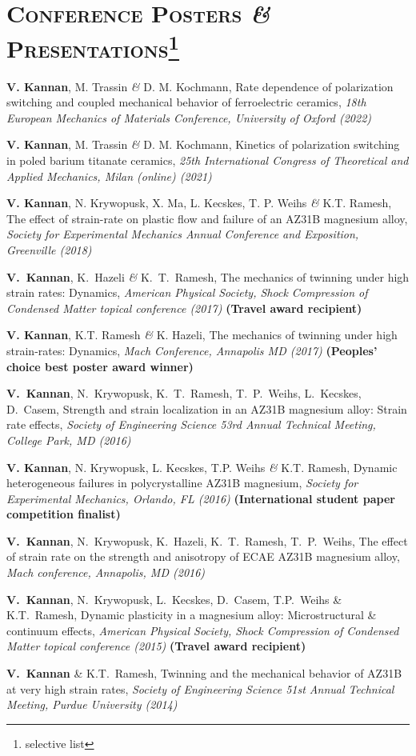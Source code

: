 \documentclass[a4paper,10pt, oneside]{article}
\begin{document}
	\section*{\large\textsc{Conference Posters \emph{\&} Presentations}\footnote[2]{selective list}}
	\begin{enumerate}[label={[\arabic*]}, leftmargin=*]
		\itemsep 5pt
		\item \textbf{V. Kannan}, M. Trassin \emph{\&} D. M. Kochmann, Rate dependence of polarization switching and coupled mechanical behavior of ferroelectric ceramics, \textit{18th European Mechanics of Materials Conference, University of Oxford (2022)}
		\item \textbf{V. Kannan}, M. Trassin \emph{\&} D. M. Kochmann, Kinetics of polarization switching in poled barium titanate ceramics, \textit{25th International Congress of Theoretical and Applied Mechanics, Milan (online) (2021)}
		\item \textbf{V. Kannan}, N. Krywopusk, X. Ma, L. Kecskes, T. P. Weihs \emph{\&} K.T. Ramesh, The effect of strain-rate on plastic flow and failure of an AZ31B magnesium alloy, \textit{Society for Experimental Mechanics Annual Conference and Exposition, Greenville (2018)}
		\item \textbf{V.~Kannan}, K.~Hazeli \emph{\&} K.~T.~Ramesh, The mechanics of twinning under high strain rates: Dynamics, \textit{American Physical Society, Shock Compression of Condensed Matter topical conference (2017)}  \textbf{(Travel award recipient)}
		\item \textbf{V. Kannan}, K.T. Ramesh \emph{\&} K. Hazeli, The mechanics of twinning under high strain-rates: Dynamics, \textit{Mach Conference, Annapolis MD (2017)} \textbf{{{(Peoples' choice best poster award winner)}}}
		\item \textbf{V.~Kannan}, N.~Krywopusk, K.~T.~Ramesh, T.~P.~Weihs, L.~Kecskes, D.~Casem, Strength and strain localization in an AZ31B magnesium alloy: Strain rate effects, \textit{Society of Engineering Science 53rd Annual Technical Meeting, College Park, MD (2016)}
		\item \textbf{V. Kannan}, N. Krywopusk, L. Kecskes, T.P. Weihs \emph{\&} K.T. Ramesh, Dynamic heterogeneous failures in polycrystalline AZ31B magnesium, \textit{Society for Experimental Mechanics, Orlando, FL (2016)} \textbf{{(International student paper competition finalist)}}
		\item \textbf{V.~Kannan}, N.~Krywopusk, K.~Hazeli, K.~T.~Ramesh, T.~P.~Weihs, The effect of strain rate on the strength and anisotropy of ECAE AZ31B magnesium alloy, \textit{Mach conference, Annapolis, MD (2016)}
		\item \textbf{V.~Kannan}, N.~Krywopusk, L.~Kecskes, D.~Casem, T.P.~Weihs \& K.T.~Ramesh, Dynamic plasticity in a magnesium alloy: Microstructural \& continuum effects, \textit{American Physical Society, Shock Compression of Condensed Matter topical conference (2015)}  \textbf{(Travel award recipient)}
		\item \textbf{V.~Kannan} \& K.T.~Ramesh, Twinning and the mechanical behavior of AZ31B at very high strain rates, \textit{Society of Engineering Science 51st Annual Technical Meeting, Purdue University (2014)}
	\end{enumerate}
\end{document}
